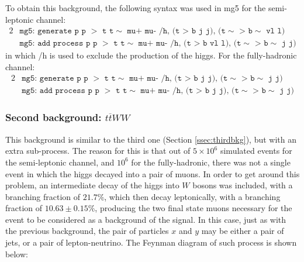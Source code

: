 To obtain this background, the following syntax was used in mg5 for the semi-leptonic channel:
\begin{alignat*}{2}
    &\texttt{mg5: generate p p $>$ t t$\sim$ mu+ mu- /h, (t > b j j), (t$\sim$ > b$\sim$ vl l) } \\
    &\texttt{mg5: add process p p $>$ t t$\sim$ mu+ mu- /h, (t > b vl l), (t$\sim$ > b$\sim$ j j)}
\end{alignat*}
in which /h is used to exclude the production of the higgs. For the fully-hadronic channel:
\begin{alignat*}{2}
    &\texttt{mg5: generate p p $>$ t t$\sim$ mu+ mu- /h, (t > b j j), (t$\sim$ > b$\sim$ j j) } \\
    &\texttt{mg5: add process p p $>$ t t$\sim$ mu+ mu- /h, (t > b j j), (t$\sim$ > b$\sim$ j j)}
\end{alignat*}

\subsubsection{Second background: $t\overline tWW$} \label{ssec:secondbkg}

This background is similar to the third one (Section \ref{ssec:thirdbkg}), but with an extra sub-process. The reason for this is that out of $5\times10^6$ simulated events for the semi-leptonic channel, and $10^6$ for the fully-hadronic, there was not a single event in which the higgs decayed into a pair of muons. In order to get around this problem, an intermediate decay of the higgs into $W$ bosons was included, with a branching fraction of $21.7\%$, which then decay leptonically, with a branching fraction of $10.63 \pm 0.15\%$, producing the two final state muons necessary for the event to be considered as a background of the signal. In this case, just as with the previous background, the pair of particles $x$ and $y$ may be either a pair of jets, or a pair of lepton-neutrino. The Feynman diagram of such process is shown below:

